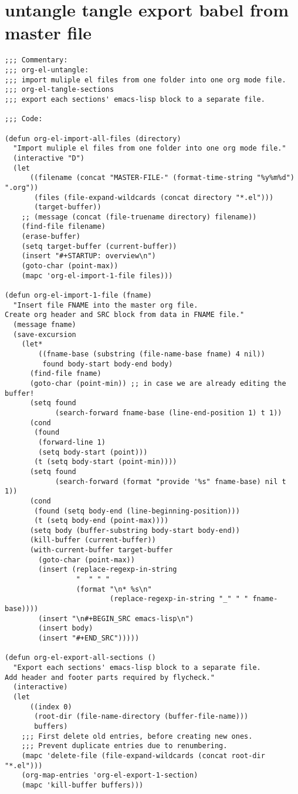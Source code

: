 \documentclass[11pt]{article}
\begin{document}
\section{untangle tangle export babel from master file}
\label{sec:org83b0d1e}

\begin{verbatim}
;;; Commentary:
;;; org-el-untangle:
;;; import muliple el files from one folder into one org mode file.
;;; org-el-tangle-sections
;;; export each sections' emacs-lisp block to a separate file.

;;; Code:

(defun org-el-import-all-files (directory)
  "Import muliple el files from one folder into one org mode file."
  (interactive "D")
  (let
      ((filename (concat "MASTER-FILE-" (format-time-string "%y%m%d") ".org"))
       (files (file-expand-wildcards (concat directory "*.el")))
       (target-buffer))
    ;; (message (concat (file-truename directory) filename))
    (find-file filename)
    (erase-buffer)
    (setq target-buffer (current-buffer))
    (insert "#+STARTUP: overview\n")
    (goto-char (point-max))
    (mapc 'org-el-import-1-file files)))

(defun org-el-import-1-file (fname)
  "Insert file FNAME into the master org file.
Create org header and SRC block from data in FNAME file."
  (message fname)
  (save-excursion
    (let*
        ((fname-base (substring (file-name-base fname) 4 nil))
         found body-start body-end body)
      (find-file fname)
      (goto-char (point-min)) ;; in case we are already editing the buffer!
      (setq found
            (search-forward fname-base (line-end-position 1) t 1))
      (cond
       (found
        (forward-line 1)
        (setq body-start (point)))
       (t (setq body-start (point-min))))
      (setq found
            (search-forward (format "provide '%s" fname-base) nil t 1))
      (cond
       (found (setq body-end (line-beginning-position)))
       (t (setq body-end (point-max))))
      (setq body (buffer-substring body-start body-end))
      (kill-buffer (current-buffer))
      (with-current-buffer target-buffer
        (goto-char (point-max))
        (insert (replace-regexp-in-string
                 "  " " "
                 (format "\n* %s\n"
                         (replace-regexp-in-string "_" " " fname-base))))
        (insert "\n#+BEGIN_SRC emacs-lisp\n")
        (insert body)
        (insert "#+END_SRC")))))

(defun org-el-export-all-sections ()
  "Export each sections' emacs-lisp block to a separate file.
Add header and footer parts required by flycheck."
  (interactive)
  (let
      ((index 0)
       (root-dir (file-name-directory (buffer-file-name)))
       buffers)
    ;;; First delete old entries, before creating new ones.
    ;;; Prevent duplicate entries due to renumbering.
    (mapc 'delete-file (file-expand-wildcards (concat root-dir "*.el")))
    (org-map-entries 'org-el-export-1-section)
    (mapc 'kill-buffer buffers)))


\end{verbatim}
\end{document}
